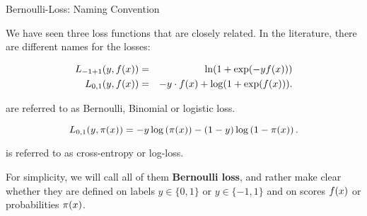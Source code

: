 \begin{vbframe}{Bernoulli-Loss: Naming Convention}

We have seen three loss functions that are closely related. In the literature, there are different names for the losses: 

\begin{eqnarray*}
  L_{-1+1}(y, f(x)) &=& \ln(1+\exp(-yf(x))) \\
  L_{0, 1}(y, f(x)) &=& - y \cdot f(x) + \log(1 + \exp(f(x))). 
\end{eqnarray*}

are referred to as Bernoulli, Binomial or logistic loss. 

  $$
    L_{0,1}(y, \pi(x)) = - y \log \left(\pi(x)\right) - (1 - y) \log \left(1 - \pi(x)\right). 
  $$

is referred to as cross-entropy or log-loss. 

\lz 

For simplicity, we will call all of them \textbf{Bernoulli loss}, and rather make clear whether they are defined on labels $y \in \{0, 1\}$ or $y \in \{-1, 1\}$ and on scores $f(x)$ or probabilities $\pi(x)$. 

\end{vbframe}

\endlecture

